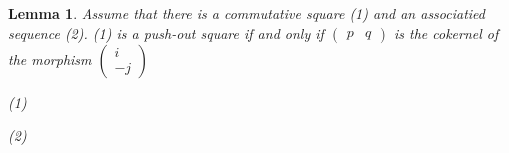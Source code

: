 \documentclass[12pt]{article}
\newtheorem{lemma}[theorem]{Lemma}
\theoremstyle{definition}
\theoremstyle{remark}
\begin{document}
            \begin{lemma}
                Assume that there is a commutative square (1) and an associatied sequence (2). (1) is a push-out square if and only if $\begin{pmatrix}
                    p & q
                \end{pmatrix}$ is the cokernel of the morphism $\begin{pmatrix}
                    i \\ -j
                \end{pmatrix}$
                \begin{center}
                    (1)
                    \space (2)
                \end{center}
            \end{lemma}
\end{document}
